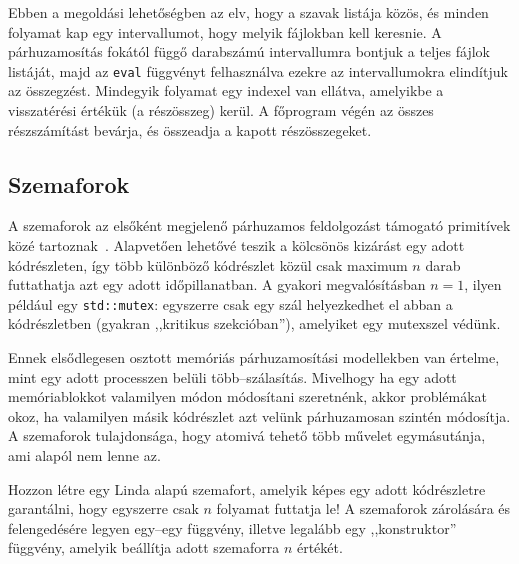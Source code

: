 \begin{sln}
    Ebben a megoldási lehetőségben az elv, hogy a szavak listája közös, és minden folyamat kap egy intervallumot, hogy melyik fájlokban kell keresnie.
    A párhuzamosítás fokától függő darabszámú intervallumra bontjuk a teljes fájlok listáját, majd az \texttt{eval} függvényt felhasználva ezekre az intervallumokra elindítjuk az összegzést.
    Mindegyik folyamat egy indexel van ellátva, amelyikbe a visszatérési értékük (a részösszeg) kerül.
    A főprogram végén az összes részszámítást bevárja, és összeadja a kapott részösszegeket.
\end{sln}

\subsection{Szemaforok}

A szemaforok az elsőként megjelenő párhuzamos feldolgozást támogató primitívek közé tartoznak~\cite{dijkstra_over_nodate}.
Alapvetően lehetővé teszik a kölcsönös kizárást egy adott kódrészleten, így több különböző kódrészlet közül csak maximum $n$ darab futtathatja azt egy adott időpillanatban.
A gyakori megvalósításban $n = 1$, ilyen például egy \texttt{std::mutex}: egyszerre csak egy szál helyezkedhet el abban a kódrészletben (gyakran ,,kritikus szekcióban''), amelyiket egy mutexszel védünk.

Ennek elsődlegesen osztott memóriás párhuzamosítási modellekben van értelme, mint egy adott processzen belüli több--szálasítás.
Mivelhogy ha egy adott memóriablokkot valamilyen módon módosítani szeretnénk, akkor problémákat okoz, ha valamilyen másik kódrészlet azt velünk párhuzamosan szintén módosítja.
A szemaforok tulajdonsága, hogy atomivá tehető több művelet egymásutánja, ami alapól nem lenne az.

\begin{xrcs}
    Hozzon létre egy Linda alapú szemafort, amelyik képes egy adott kódrészletre garantálni, hogy egyszerre csak $n$ folyamat futtatja le!
    A szemaforok zárolására és felengedésére legyen egy--egy függvény, illetve legalább egy ,,konstruktor'' függvény, amelyik beállítja adott szemaforra $n$ értékét.

%
\end{xrcs}

